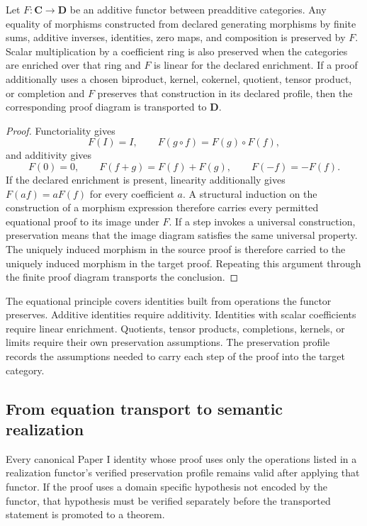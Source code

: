 \begin{theorem}
\label{thm:realization-export}
Let $F:\mathbf C\to\mathbf D$ be an additive functor between preadditive categories.  Any equality of morphisms constructed from declared generating morphisms by finite sums, additive inverses, identities, zero maps, and composition is preserved by $F$.  Scalar multiplication by a coefficient ring is also preserved when the categories are enriched over that ring and $F$ is linear for the declared enrichment.  If a proof additionally uses a chosen biproduct, kernel, cokernel, quotient, tensor product, or completion and $F$ preserves that construction in its declared profile, then the corresponding proof diagram is transported to $\mathbf D$.
\end{theorem}

\begin{proof}
Functoriality gives
\[
F(I)=I,
\qquad
F(g\circ f)=F(g)\circ F(f),
\]
and additivity gives
\[
F(0)=0,
\qquad
F(f+g)=F(f)+F(g),
\qquad
F(-f)=-F(f).
\]
If the declared enrichment is present, linearity additionally gives $F(af)=aF(f)$ for every coefficient $a$.  A structural induction on the construction of a morphism expression therefore carries every permitted equational proof to its image under $F$.  If a step invokes a universal construction, preservation means that the image diagram satisfies the same universal property.  The uniquely induced morphism in the source proof is therefore carried to the uniquely induced morphism in the target proof.  Repeating this argument through the finite proof diagram transports the conclusion.
\end{proof}

\begin{interpretation}
The equational principle covers identities built from operations the functor preserves.  Additive identities require additivity.  Identities with scalar coefficients require linear enrichment.  Quotients, tensor products, completions, kernels, or limits require their own preservation assumptions.  The preservation profile records the assumptions needed to carry each step of the proof into the target category.
\end{interpretation}


\subsection{From equation transport to semantic realization}
\begin{proposition}
\label{prop:realization-export}
Every canonical Paper I identity whose proof uses only the operations listed in a realization functor's verified preservation profile remains valid after applying that functor.  If the proof uses a domain specific hypothesis not encoded by the functor, that hypothesis must be verified separately before the transported statement is promoted to a theorem.
\end{proposition}


